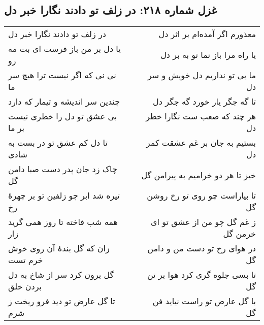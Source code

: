 \begin{center}
\section*{غزل شماره ۲۱۸: در زلف تو دادند نگارا خبر دل}
\label{sec:218}
\begin{longtable}{l p{0.5cm} r}
در زلف تو دادند نگارا خبر دل
&&
معذورم اگر آمده‌ام بر اثر دل
\\
یا دل بر من باز فرست ای بت مه رو
&&
یا راه مرا باز نما تو به بر دل
\\
نی نی که اگر نیست ترا هیچ سر ما
&&
ما بی تو نداریم دل خویش و سر دل
\\
چندین سر اندیشه و تیمار که دارد
&&
تا گه جگر یار خورد گه جگر دل
\\
بی عشق تو دل را خطری نیست بر ما
&&
هر چند که صعب ست نگارا خطر دل
\\
تا دل کم عشق تو در بست به شادی
&&
بستیم به جان بر غم عشقت کمر دل
\\
چاک زد جان پدر دست صبا دامن گل
&&
خیز تا هر دو خرامیم به پیرامن گل
\\
تیره شد ابر چو زلفین تو بر چهرهٔ رخ
&&
تا بیاراست چو روی تو رخ روشن گل
\\
همه شب فاخته تا روز همی گرید زار
&&
ز غم گل چو من از عشق تو ای خرمن گل
\\
زان که گل بندهٔ آن روی خوش خرم تست
&&
در هوای رخ تو دست من و دامن گل
\\
گل برون کرد سر از شاخ به دل بردن خلق
&&
تا بسی جلوه گری کرد هوا بر تن گل
\\
تا گل عارض تو دید فرو ریخت ز شرم
&&
با گل عارض تو راست نیاید فن گل
\\
\end{longtable}
\end{center}
